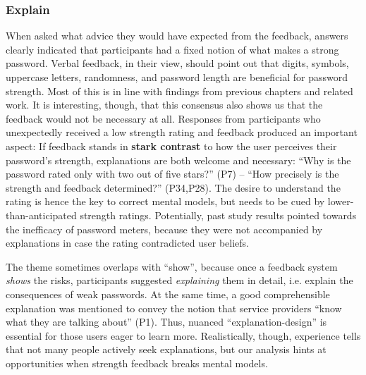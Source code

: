 \subsubsection{Explain}
When asked what advice they would have expected from the feedback, answers clearly indicated that participants had a fixed notion of what makes a strong password. Verbal feedback, in their view, should point out that digits, symbols, uppercase letters, randomness, and password length are beneficial for password strength. Most of this is in line with findings from previous chapters and related work. It is interesting, though, that this consensus also shows us that the feedback would not be necessary at all. Responses from participants who unexpectedly received a low strength rating and feedback produced an important aspect: If feedback stands in \textbf{stark contrast} to how the user perceives their password's strength, explanations are both welcome and necessary: ``Why is the password rated only with two out of five stars?'' (P7) -- ``How precisely is the strength and feedback determined?'' (P34,P28). The desire to understand the rating is hence the key to correct mental models, but needs to be cued by lower-than-anticipated strength ratings. Potentially, past study results pointed towards the inefficacy of password meters, because they were not accompanied by explanations in case the rating contradicted user beliefs. 

The theme sometimes overlaps with ``show'', because once a feedback system \textit{shows} the risks, participants suggested \textit{explaining} them in detail, i.e. explain the consequences of weak passwords. At the same time, a good comprehensible explanation was mentioned to convey the notion that service providers ``know what they are talking about'' (P1). Thus, nuanced ``explanation-design'' is essential for those users eager to learn more. Realistically, though, experience tells that not many people actively seek explanations, but our analysis hints at opportunities when strength feedback breaks mental models.




